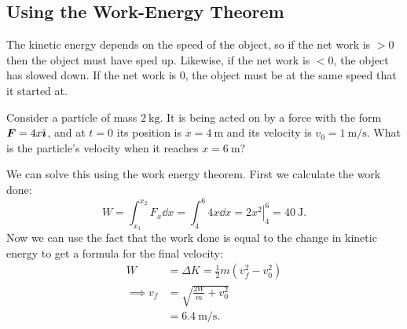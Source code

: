 \documentclass[../classical_mechanics.tex]{subfiles}
\begin{document}
        \subsection{Using the Work-Energy Theorem}\label{subsec:using-the-work-energy-theorem}
            The kinetic energy depends on the speed of the object, so if the net work is $>0$ then the object must have sped up.
            Likewise, if the net work is $<0$, the object has slowed down.
            If the net work is 0, the object must be at the same speed that it started at.
            \begin{example}
                Consider a particle of mass $\qty{2}{\kilogram}$.
                It is being acted on by a force with the form $\boldsymbol{F}=4x\hat{\boldsymbol{\imath}}$, and at $t=0$ its position is $x=\qty{4}{\meter}$ and its velocity is $v_0=\qty{1}{\meter\per\second}$.
                What is the particle's velocity when it reaches $x=\qty{6}{\meter}$?

                We can solve this using the work energy theorem.
                First we calculate the work done:
                \begin{equation}
                    W=\int_{x_1}^{x_2}F_x\dd{x}=\int_{4}^{6}4x\dd{x}=\left.2x^2\right|_4^6=\qty{40}{\joule}.
                \end{equation}
                Now we can use the fact that the work done is equal to the change in kinetic energy to get a formula for the final velocity:
                \begin{align}
                    W&=\Delta K=\frac{1}{2}m(v_f^2-v_0^2)\\
                    \implies v_f&=\sqrt{\frac{2W}{m}+v_0^2}\\
                    &=\qty{6.4}{\meter\per\second}.
                \end{align}
            \end{example}
        
\end{document}
